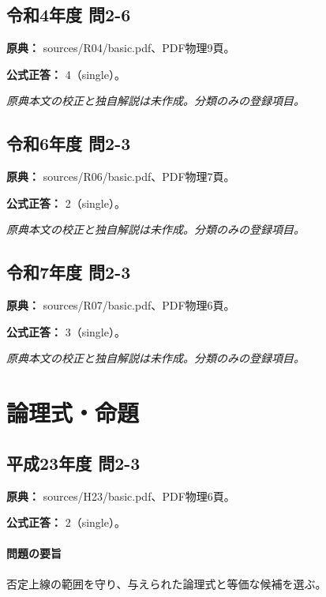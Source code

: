 \subsection{令和4年度 問2-6}
\label{q:r04-reg-basic-2-6}

\noindent\textbf{原典：} sources/R04/basic.pdf、PDF物理9頁。

\textbf{公式正答：} 4（single）。

\par\textit{原典本文の校正と独自解説は未作成。分類のみの登録項目。}

\subsection{令和6年度 問2-3}
\label{q:r06-reg-basic-2-3}

\noindent\textbf{原典：} sources/R06/basic.pdf、PDF物理7頁。

\textbf{公式正答：} 2（single）。

\par\textit{原典本文の校正と独自解説は未作成。分類のみの登録項目。}

\subsection{令和7年度 問2-3}
\label{q:r07-reg-basic-2-3}

\noindent\textbf{原典：} sources/R07/basic.pdf、PDF物理6頁。

\textbf{公式正答：} 3（single）。

\par\textit{原典本文の校正と独自解説は未作成。分類のみの登録項目。}

\section{論理式・命題}

\subsection{平成23年度 問2-3}
\label{q:h23-reg-basic-2-3}

\noindent\textbf{原典：} sources/H23/basic.pdf、PDF物理6頁。

\textbf{公式正答：} 2（single）。

\paragraph{問題の要旨} 否定上線の範囲を守り、与えられた論理式と等価な候補を選ぶ。

